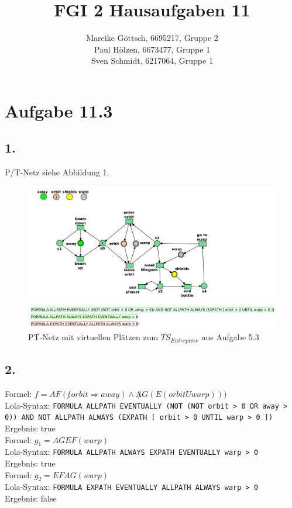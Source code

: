 \documentclass[12pt, paper=a4]{article}
\author{Mareike G\"ottsch, 6695217, Gruppe 2\\Paul H\"olzen, 6673477, Gruppe 1\\Sven Schmidt, 6217064, Gruppe 1}
\title{FGI 2 Hausaufgaben 11}
\begin{document}
\maketitle

\section*{Aufgabe 11.3}
\subsection*{1.}
P/T-Netz siehe Abbildung 1.\\

\begin{figure}[h!]
\centering
\includegraphics[scale=0.7]{EnterprisePT.pdf}
\caption{PT-Netz mit virtuellen Plätzen zum $TS_{Enterprise}$ aus Aufgabe 5.3}
\end{figure}

\subsection*{2.}
Formel: $f = AF(\not(orbit \Rightarrow away) \land \not AG(E(orbit U warp)))$\\
Lola-Syntax: \texttt{FORMULA ALLPATH EVENTUALLY (NOT (NOT orbit > 0 OR away > 0)) AND NOT ALLPATH ALWAYS (EXPATH [ orbit > 0 UNTIL warp > 0 ])}\\
Ergebnis: true\\

Formel: $g_1 = AGEF(warp)$\\
Lola-Syntax: \texttt{FORMULA ALLPATH ALWAYS EXPATH EVENTUALLY warp > 0}\\
Ergebnis: true\\

Formel: $g_2 = EFAG(warp)$\\
Lola-Syntax: \texttt{FORMULA EXPATH EVENTUALLY ALLPATH ALWAYS warp > 0}\\
Ergebnis: false\\
\end{document}

